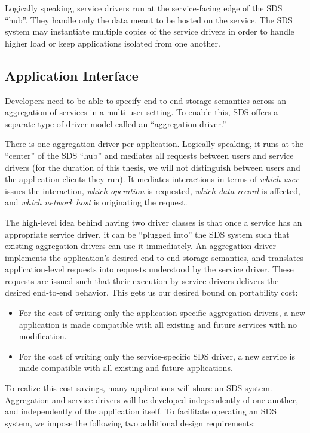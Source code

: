 Logically speaking, service drivers run at the service-facing edge of the SDS ``hub''.  They
handle only the data meant to be hosted on the service.  The SDS system may
instantiate multiple copies of the service drivers in order to handle higher
load or keep applications isolated from one another.

\subsection{Application Interface}

Developers need to be able to specify
end-to-end storage semantics across an aggregation of services
in a multi-user setting.  To enable this,
SDS offers a separate type of driver model called an ``aggregation
driver.''

There is one aggregation driver per application.  Logically speaking, it runs at
the ``center'' of the SDS ``hub'' and mediates all requests between users and
service drivers (for the duration of this thesis, we will not
distinguish between users and the application clients
they run).  It mediates interactions in terms of \emph{which user} issues the
interaction, \emph{which operation} is requested, \emph{which data
record} is affected, and \emph{which network host} is originating the request.

The high-level idea behind having two driver classes is that once a service has an appropriate service driver,
it can be ``plugged into'' the SDS system such that existing aggregation drivers
can use it immediately.  An aggregation driver implements the application's desired end-to-end storage
semantics, and translates
application-level requests into requests understood by the service driver.  These
requests are issued such that their execution
by service drivers delivers the desired end-to-end behavior.  This gets us our
desired bound on portability cost:

\begin{itemize}
    \item For the cost of writing only the application-specific
aggregation drivers, a new application is made
compatible with all existing and future services with no modification.
    \item For the cost of writing only the service-specific SDS driver, a new
service is made compatible with all existing and future applications.
\end{itemize}

To realize this cost savings, many applications will share an SDS system.  Aggregation and service drivers
will be developed independently of one another, and independently of the application itself.
To facilitate operating an SDS system, we impose the following two additional design
requirements:

